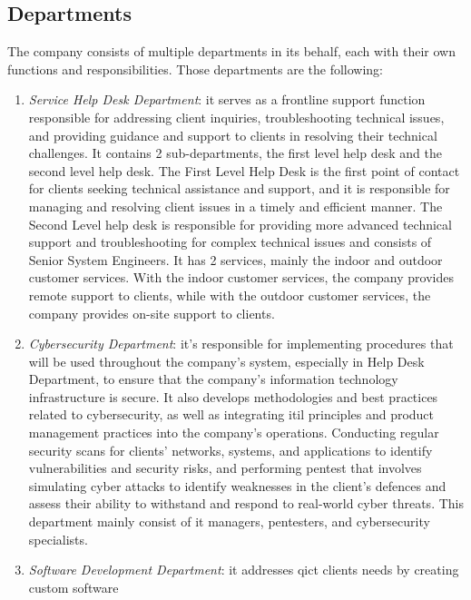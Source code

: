 \begin{multicols}{2}
      \subsection{Departments}
      The company consists of multiple departments in its behalf, each with their own functions and responsibilities.
      Those departments are the following:
      \begin{enumerate}
            \item \textit{Service Help Desk Department}: it serves as a frontline support function responsible for addressing client inquiries,
                  troubleshooting technical issues, and providing guidance and support to clients in resolving their technical
                  challenges. It contains 2 sub-departments, the first level help desk and the second level help desk. The First Level Help
                  Desk is the first point of contact for clients seeking technical assistance and support, and it is responsible for managing and
                  resolving client issues in a timely and efficient manner. The Second Level help desk is responsible for providing more advanced
                  technical support and troubleshooting for complex technical issues and consists of Senior System Engineers. It has 2 services,
                  mainly the indoor and outdoor customer services. With the indoor customer services, the company provides remote support to
                  clients, while with the outdoor customer services, the company provides on-site support to clients.
            \item \textit{Cybersecurity Department}: it's responsible for implementing procedures that will be used throughout the company's system,
                  especially in Help Desk Department, to ensure that the company's information technology infrastructure is secure. It also
                  develops methodologies and best practices related to cybersecurity, as well as integrating \acrshort{itil} principles and
                  product management practices into the company's operations. Conducting regular security scans for clients' networks, systems,
                  and applications to identify vulnerabilities and security risks, and performing \gls{pentest} that involves simulating
                  cyber attacks to identify weaknesses in the client's defences and assess their ability to withstand and respond to real-world
                  cyber threats. This department mainly consist of \acrshort{it} managers, pentesters, and cybersecurity specialists.
            \item \textit{Software Development Department}: it addresses \acrshort{qict} clients needs by creating custom software

\end{enumerate}
\end{multicols}
